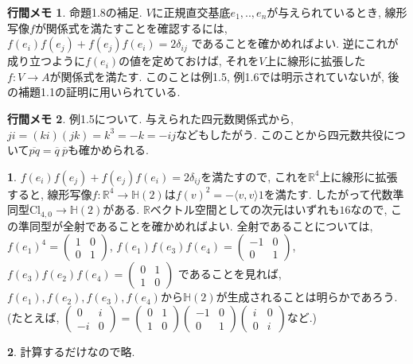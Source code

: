 \documentclass[dvipdfmx]{amsart}
\theoremstyle{definition}
\newtheorem{ans}{}
\numberwithin{ans}{section}
\newtheorem{mynote}{行間メモ}
\numberwithin{mynote}{section}
\newenvironment{note}
  {\begin{leftbar}\begin{mynote}}
  {\end{mynote}\end{leftbar}}
\begin{document}
\begin{note}
  命題1.8の補足. $V$に正規直交基底$e_1,..,e_n$が与えられているとき,
  線形写像$f$が関係式を満たすことを確認するには,
  $f(e_i)f(e_j) + f(e_j)f(e_i) = 2\delta_{ij}$
  であることを確かめればよい.
  逆にこれが成り立つように$f(e_i)$の値を定めておけば, それを$V$上に線形に拡張した
  $f: V \rightarrow A$が関係式を満たす.
  このことは例1.5, 例1.6では明示されていないが, 後の補題1.1の証明に用いられている.
\end{note}

\begin{note}
  例1.5について. 与えられた四元数関係式から, $ji = (ki)(jk) = k^3 = -k = -ij$などもしたがう.
  このことから四元数共役について$\overline{pq} = \overline{q}\ \overline{p}$も確かめられる.
\end{note}

\begin{ans}
  $f(e_i)f(e_j) + f(e_j)f(e_i) = 2\delta_{ij}$を満たすので,
  これを$\mathbb{R}^4$上に線形に拡張すると,
  線形写像$f: \mathbb{R}^4 \rightarrow \mathbb{H}(2)$は$f(v)^2 = -\langle v, v \rangle 1$を満たす.
  したがって代数準同型$\mathrm{Cl}_{4, 0} \rightarrow \mathbb{H}(2)$がある.
  $\mathbb{R}$ベクトル空間としての次元はいずれも$16$なので, この準同型が全射であることを確かめればよい.
  全射であることについては,
  $f(e_1)^4 = \begin{pmatrix}
    1 & 0 \\
    0 & 1
  \end{pmatrix}$,
  $f(e_1)f(e_3)f(e_4) = \begin{pmatrix}
    -1 & 0 \\
    0 & 1
  \end{pmatrix}$,
  $f(e_3)f(e_2)f(e_4) = \begin{pmatrix}
    0 & 1 \\
    1 & 0
  \end{pmatrix}$
  であることを見れば, $f(e_1), f(e_2), f(e_3), f(e_4)$から$\mathbb{H}(2)$が生成されることは明らかであろう.
  (たとえば, $\begin{pmatrix}
    0 & i \\
    -i & 0
  \end{pmatrix} = \begin{pmatrix}
    0 & 1 \\
    1 & 0
  \end{pmatrix}\begin{pmatrix}
    -1 & 0 \\
    0 & 1
  \end{pmatrix}\begin{pmatrix}
    i & 0 \\
    0 & i
  \end{pmatrix}$など.)
\end{ans}

\begin{ans}
  計算するだけなので略.
\end{ans}
\end{document}

